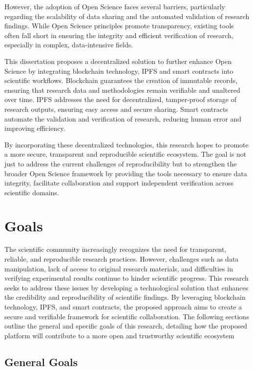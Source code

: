 \documentclass{article}
\begin{document}
However, the adoption of Open Science faces several barriers, particularly regarding the scalability of data sharing and the automated validation of research findings. While Open Science principles promote transparency, existing tools often fall short in ensuring the integrity and efficient verification of research, especially in complex, data-intensive fields.

This dissertation proposes a decentralized solution to further enhance Open Science by integrating blockchain technology, IPFS and smart contracts into scientific workflows. Blockchain guarantees the creation of immutable records, ensuring that research data and methodologies remain verifiable and unaltered over time. IPFS addresses the need for decentralized, tamper-proof storage of research outputs, ensuring easy access and secure sharing. Smart contracts automate the validation and verification of research, reducing human error and improving efficiency.

By incorporating these decentralized technologies, this research hopes to promote a more secure, transparent and reproducible scientific ecosystem. The goal is not just to address the current challenges of reproducibility but to strengthen the broader Open Science framework by providing the tools necessary to ensure data integrity, facilitate collaboration and support independent verification across scientific domains.

\section{Goals}

The scientific community increasingly recognizes the need for transparent, reliable, and reproducible research practices. However, challenges such as data manipulation, lack of access to original research materials, and difficulties in verifying experimental results continue to hinder scientific progress. This research seeks to address these issues by developing a technological solution that enhances the credibility and reproducibility of scientific findings. By leveraging blockchain technology, IPFS, and smart contracts, the proposed approach aims to create a secure and verifiable framework for scientific collaboration. The following sections outline the general and specific goals of this research, detailing how the proposed platform will contribute to a more open and trustworthy scientific ecosystem

\subsection{General Goals}
\end{document}

